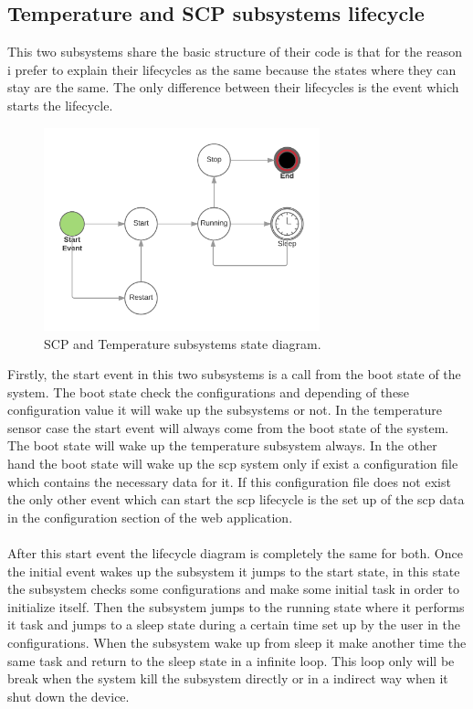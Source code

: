 	\subsection{Temperature and SCP subsystems lifecycle}
	This two subsystems share the basic structure of their code is that for the reason i prefer to explain their lifecycles as the same because the states where they can stay are the same. The only difference between their lifecycles is the event which starts the lifecycle.

	\begin{figure}[h!]
	\includegraphics[width=8cm]{fig/daemon.png}
	\centering
	\caption{SCP and Temperature subsystems state diagram.\label{states}}
	\end{figure}

	Firstly, the start event in this two subsystems is a call from the boot state of the system. The boot state check the configurations and depending of these configuration value it will wake up the subsystems or not. In the temperature sensor case the start event will always come from the boot state of the system. The boot state will wake up the temperature subsystem always. In the other hand the boot state will wake up the scp system only if exist a configuration file which contains the necessary data for it. If this configuration file does not exist the only other event which can start the scp lifecycle is the set up of the scp data in the configuration section of the web application.
	\\
	\\
	After this start event the lifecycle diagram is completely the same for both. Once the initial event wakes up the subsystem it jumps to the start state, in this state the subsystem checks some configurations and make some initial task in order to initialize itself. Then the subsystem jumps to the running state where it performs it task and jumps to a sleep state during a certain time set up by the user in the configurations. When the subsystem wake up from sleep it make another time the same task and return to the sleep state in a infinite loop. This loop only will be break when the system kill the subsystem directly or in a indirect way when it shut down the device. %


